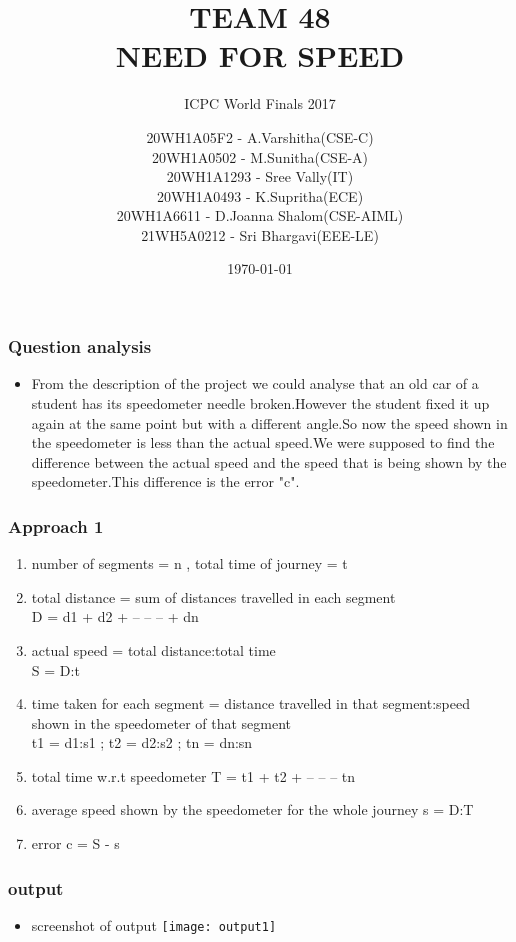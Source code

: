 \documentclass{beamer}
\title{TEAM 48\\NEED FOR SPEED}
\subtitle{ICPC World Finals 2017}
\author{20WH1A05F2 - A.Varshitha(CSE-C)\\20WH1A0502 - M.Sunitha(CSE-A)\\20WH1A1293 - Sree Vally(IT)\\20WH1A0493 - K.Supritha(ECE)\\20WH1A6611 - D.Joanna Shalom(CSE-AIML)\\21WH5A0212 - Sri Bhargavi(EEE-LE)}
\date{\today}
\begin{document}
    \begin{frame}
            \titlepage
    \end{frame}

    \begin{frame}
            \frametitle{Question analysis}
            \begin{itemize}
                    \item From the description of the project we could analyse that an old car of a student has its speedometer needle broken.However the student fixed it up again at the same point but with a different angle.So now the speed shown in the speedometer is less than the actual speed.We were supposed to find the difference between the actual speed and the speed that is being shown by the speedometer.This difference is the error "c".
            \end{itemize}
    \end{frame}

    \begin{frame}
            \frametitle{Approach 1 }
            \begin{enumerate}
                    \item number of segments = n , total time of journey = t
                    \item total distance = sum of distances travelled in each segment\\D = d1 + d2 + -- -- -- + dn
                    \item actual speed = total distance:total time\\S = D:t
                    \item time taken for each segment = distance travelled in that segment:speed shown in the speedometer of that segment\\t1 = d1:s1 ; t2 = d2:s2 ; tn = dn:sn
                    \item total time w.r.t speedometer T = t1 + t2 + -- -- -- tn
                    \item average speed shown by the speedometer for the whole journey s = D:T                                              
	     	    \item error c = S - s
            \end{enumerate}
    \end{frame}

    \begin{frame}
	 \frametitle{output}
        \begin{itemize}
                \item screenshot of output
                        \texttt{[image: output1]}
        \end{itemize}
    \end{frame}
\end{document}
